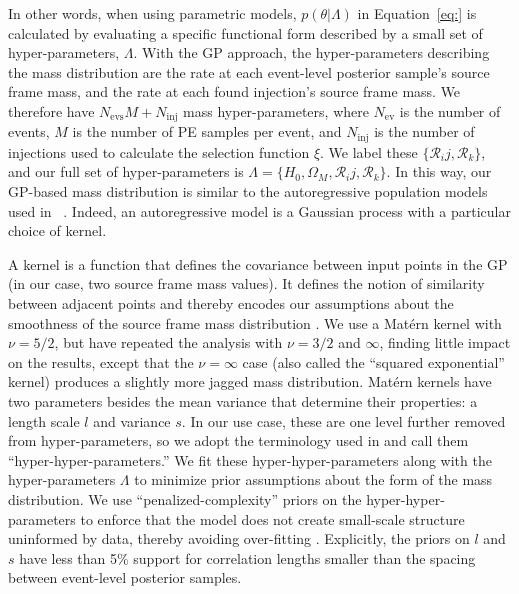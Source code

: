 \documentclass[]{aastex631}
\begin{document}
In other words, when using parametric models, $p(\theta|\Lambda)$ in Equation~\ref{eq:} is calculated by evaluating a specific functional form described by a small set of hyper-parameters, $\Lambda$. 
With the GP approach, the hyper-parameters describing the mass distribution are the rate at each event-level posterior sample's source frame mass, and the rate at each found injection's source frame mass.
We therefore have $N_{\text{evs}}M + N_{\text{inj}}$ mass hyper-parameters, where $N_{\text{ev}}$ is the number of events, $M$ is the number of PE samples per event, and $N_{\text{inj}}$ is the number of injections used to calculate the selection function $\xi$.
We label these $\{\mathcal{R}_ij,\mathcal{R}_k\}$, and our full set of hyper-parameters is $\Lambda=\{H_0, \Omega_M, \mathcal{R}_ij,\mathcal{R}_k\}$. 
In this way, our GP-based mass distribution is similar to the autoregressive population models used in ~\citet{callister_ar}.
Indeed, an autoregressive model is a Gaussian process with a particular choice of kernel.

A kernel is a function that defines the covariance between input points in the GP (in our case, two source frame mass values). 
It defines the notion of similarity between adjacent points and thereby encodes our assumptions about the smoothness of the source frame mass distribution \citep{rasmussen_gaussian_2006}.
We use a Mat\'ern kernel \citep{handcock_and_stein,stein_1999} with $\nu = 5/2$, but have repeated the analysis with $\nu=3/2$ and $\infty$, finding little impact on the results, except that the $\nu=\infty$ case (also called the ``squared exponential'' kernel) produces a slightly more jagged mass distribution.
Mat\'ern kernels have two parameters besides the mean variance that determine their properties: a length scale $l$ and variance $s$.
In our use case, these are one level further removed from hyper-parameters, so we adopt the terminology used in \citet{callister_ar} and call them ``hyper-hyper-parameters.''
We fit these hyper-hyper-parameters along with the hyper-parameters $\Lambda$ to minimize prior assumptions about the form of the mass distribution.
We use ``penalized-complexity'' priors on the hyper-hyper-parameters to enforce that the model does not create small-scale structure uninformed by data, thereby avoiding over-fitting \citep{simpson_penalising_2017,simpson_garcpas_2022}. %
Explicitly, the priors on $l$ and $s$ have less than 5\% support for correlation lengths smaller than the  spacing between event-level posterior samples.
\end{document}
